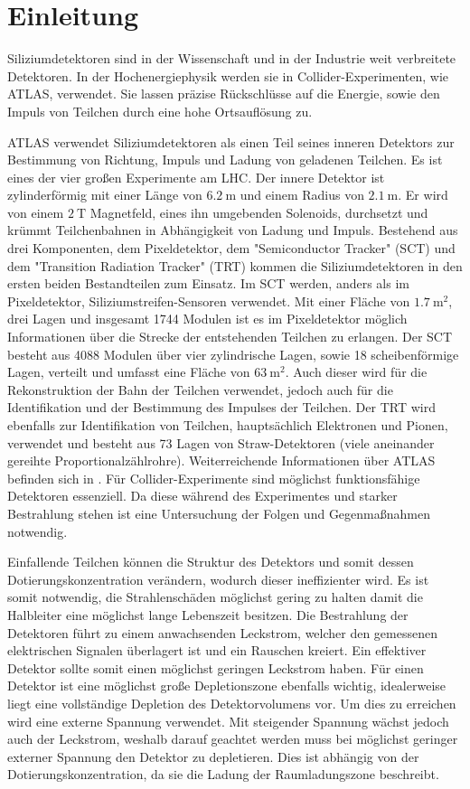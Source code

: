 \chapter{Einleitung}
Siliziumdetektoren sind in der Wissenschaft und in der Industrie weit verbreitete
Detektoren. In der Hochenergiephysik werden sie in Collider-Experimenten, wie ATLAS, verwendet.
Sie  lassen präzise Rückschlüsse auf die Energie, sowie den Impuls von Teilchen durch eine
hohe Ortsauflösung zu.


ATLAS verwendet Siliziumdetektoren als
einen Teil seines inneren Detektors zur Bestimmung von Richtung, Impuls
und Ladung von geladenen Teilchen. Es ist eines der vier großen Experimente am LHC.
Der innere Detektor ist zylinderförmig mit einer Länge von $\SI{6.2}{\meter}$ und
einem Radius von $\SI{2.1}{\meter}$. Er wird von einem $\SI{2}{\tesla}$ Magnetfeld, eines ihn umgebenden Solenoids,
durchsetzt und krümmt Teilchenbahnen in Abhängigkeit von Ladung und Impuls.
Bestehend aus drei Komponenten, dem Pixeldetektor, dem "Semiconductor Tracker" (SCT) und dem "Transition Radiation Tracker" (TRT) kommen  die
Siliziumdetektoren in den ersten beiden Bestandteilen zum Einsatz. Im SCT werden, anders als im Pixeldetektor, Siliziumstreifen-Sensoren verwendet.
Mit einer Fläche von $\SI{1.7}{\meter\squared}$, drei Lagen und insgesamt 1744 Modulen ist es im Pixeldetektor möglich
Informationen über die Strecke der entstehenden Teilchen zu erlangen. Der SCT besteht aus 4088 Modulen über vier zylindrische Lagen,
sowie 18 scheibenförmige Lagen, verteilt und umfasst eine Fläche von $\SI{63}{\meter\squared}$. Auch dieser wird für
die Rekonstruktion der Bahn der Teilchen verwendet, jedoch auch für die Identifikation und der Bestimmung des Impulses der Teilchen.
Der TRT wird ebenfalls zur Identifikation von Teilchen, hauptsächlich Elektronen und Pionen, verwendet und besteht aus 73 Lagen
von Straw-Detektoren (viele aneinander gereihte Proportionalzählrohre).
Weiterreichende Informationen über ATLAS befinden sich in \cite{ATLAS}.
Für Collider-Experimente sind möglichst funktionsfähige Detektoren essenziell. Da diese während des Experimentes und starker Bestrahlung
stehen ist eine Untersuchung der Folgen und Gegenmaßnahmen notwendig.


Einfallende Teilchen können die
Struktur des Detektors und somit dessen Dotierungskonzentration verändern, wodurch dieser ineffizienter wird.
Es ist somit notwendig, die Strahlenschäden möglichst gering zu halten damit
die Halbleiter eine möglichst lange Lebenszeit besitzen.
Die Bestrahlung der Detektoren führt zu einem anwachsenden Leckstrom, welcher den
gemessenen elektrischen Signalen überlagert ist und ein Rauschen kreiert. Ein
effektiver Detektor sollte somit einen möglichst geringen Leckstrom haben.
Für einen Detektor ist eine möglichst große Depletionszone ebenfalls wichtig, idealerweise
liegt eine vollständige Depletion des Detektorvolumens vor. Um dies zu erreichen wird
eine externe Spannung verwendet. Mit steigender Spannung wächst jedoch auch der Leckstrom, weshalb
darauf geachtet werden muss bei möglichst geringer externer Spannung den Detektor zu depletieren.
Dies ist abhängig von der Dotierungskonzentration, da sie die Ladung der
Raumladungszone beschreibt.

